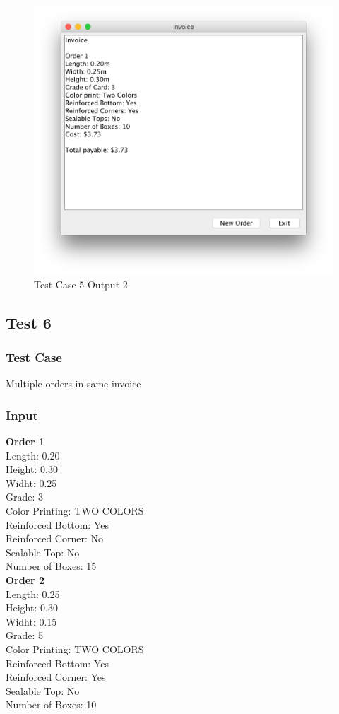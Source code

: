 \documentclass[12pt]{article}
\begin{document}
\begin{figure}[H]
	\includegraphics[width=\linewidth]{./screenshots/test_case_5_output_2.png}
	\caption{Test Case 5 Output 2}
	\label{test_case_5_output}
\end{figure}
\newpage
\subsection{Test 6}
\subsubsection{Test Case}
Multiple orders in same invoice
\subsubsection{Input}
\textbf{Order 1}\\
Length: 0.20\\
Height: 0.30\\
Widht: 0.25\\
Grade: 3\\
Color Printing: TWO COLORS\\
Reinforced Bottom: Yes\\
Reinforced Corner: No\\
Sealable Top: No\\
Number of Boxes: 15\\

\textbf{Order 2}\\
Length: 0.25\\
Height: 0.30\\
Widht: 0.15\\
Grade: 5\\
Color Printing: TWO COLORS\\
Reinforced Bottom: Yes\\
Reinforced Corner: Yes\\
Sealable Top: No\\
Number of Boxes: 10\\
\end{document}
